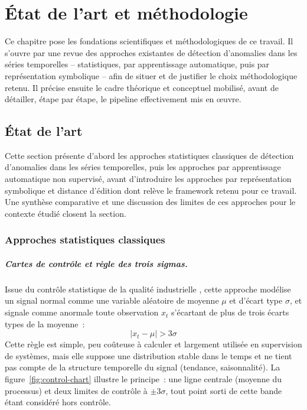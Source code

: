 \chapter{État de l'art et méthodologie}
\label{chap:etatart}

Ce chapitre pose les fondations scientifiques et méthodologiques de ce
travail. Il s'ouvre par une revue des approches existantes de
détection d'anomalies dans les séries temporelles -- statistiques,
par apprentissage automatique, puis par représentation symbolique --
afin de situer et de justifier le choix méthodologique retenu. Il
précise ensuite le cadre théorique et conceptuel mobilisé, avant de
détailler, étape par étape, le pipeline effectivement mis en œuvre.

\clearpage
\section{État de l'art}

Cette section présente d'abord les approches statistiques classiques
de détection d'anomalies dans les séries temporelles, puis les
approches par apprentissage automatique non supervisé, avant
d'introduire les approches par représentation symbolique et distance
d'édition dont relève le framework retenu pour ce travail. Une
synthèse comparative et une discussion des limites de ces approches
pour le contexte étudié closent la section.

\subsection{Approches statistiques classiques}

\paragraph{Cartes de contrôle et règle des trois sigmas.}
Issue du contrôle statistique de la qualité industrielle
\parencite{shewhart1931economic}, cette approche modélise un signal normal comme une
variable aléatoire de moyenne $\mu$ et d'écart type $\sigma$, et
signale comme anormale toute observation $x_t$ s'écartant de plus de
trois écarts types de la moyenne~:
\begin{equation}
  |x_t - \mu| > 3\sigma
\end{equation}
Cette règle est simple, peu coûteuse à calculer et largement utilisée
en supervision de systèmes, mais elle suppose une distribution stable
dans le temps et ne tient pas compte de la structure temporelle du
signal (tendance, saisonnalité). La figure~\ref{fig:control-chart}
illustre le principe~: une ligne centrale (moyenne du processus) et
deux limites de contrôle à $\pm 3\sigma$, tout point sorti de cette
bande étant considéré hors contrôle.

